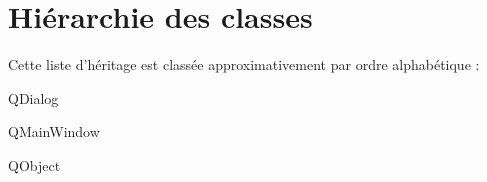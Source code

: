 \section{Hiérarchie des classes}
Cette liste d'héritage est classée approximativement par ordre alphabétique \-:\begin{DoxyCompactList}
\item Q\-Dialog\begin{DoxyCompactList}
\item {}
\item {}
\item {}
\item {}
\end{DoxyCompactList}
\item Q\-Main\-Window\begin{DoxyCompactList}
\item {}
\end{DoxyCompactList}
\item Q\-Object\begin{DoxyCompactList}
\item {}
\end{DoxyCompactList}
\end{DoxyCompactList}
